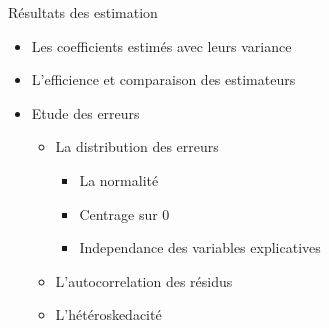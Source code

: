\documentclass[11pt,ignorenonframetext,]{beamer}
\providecommand{\tightlist}{%
  \setlength{\itemsep}{0pt}\setlength{\parskip}{0pt}}
\begin{document}
\begin{frame}{Résultats des estimation}
\protect\hypertarget{resultats-des-estimation}{}

\begin{itemize}
\tightlist
\item
  Les coefficients estimés avec leurs variance
\item
  L'efficience et comparaison des estimateurs
\item
  Etude des erreurs

  \begin{itemize}
  \tightlist
  \item
    La distribution des erreurs

    \begin{itemize}
    \tightlist
    \item
      La normalité
    \item
      Centrage sur 0
    \item
      Independance des variables explicatives
    \end{itemize}
  \item
    L'autocorrelation des résidus
  \item
    L'hétéroskedacité
  \end{itemize}
\end{itemize}

\end{frame}
\end{document}
